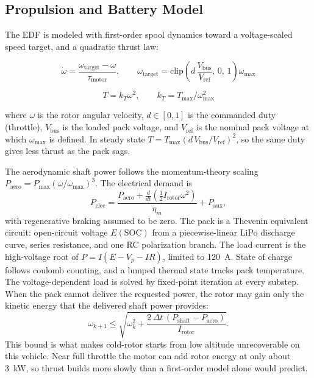 \documentclass[conference]{IEEEtran}
\begin{document}
\subsection{Propulsion and Battery Model}
\label{sec:propulsion}

The EDF is modeled with first-order spool dynamics toward a voltage-scaled speed target, and a quadratic thrust law:

\begin{equation}
\dot{\omega} = \frac{\omega_{\text{target}} - \omega}{\tau_{\text{motor}}}, \qquad
\omega_{\text{target}} = \text{clip}\!\left(d\,\frac{V_{\text{bus}}}{V_{\text{ref}}},\,0,\,1\right)\omega_{\max}
\label{eq:spool}
\end{equation}

\begin{equation}
T = k_T \omega^2, \qquad k_T = T_{\max}/\omega_{\max}^2
\label{eq:thrust}
\end{equation}

\noindent where $\omega$ is the rotor angular velocity, $d \in [0,1]$ is the commanded duty (throttle), $V_{\text{bus}}$ is the loaded pack voltage, and $V_{\text{ref}}$ is the nominal pack voltage at which $\omega_{\max}$ is defined. In steady state $T = T_{\max}(d\,V_{\text{bus}}/V_{\text{ref}})^2$, so the same duty gives less thrust as the pack sags.

The aerodynamic shaft power follows the momentum-theory scaling $P_{\text{aero}} = P_{\max}(\omega/\omega_{\max})^3$. The electrical demand is
\begin{equation}
P_{\text{elec}} = \frac{P_{\text{aero}} + \frac{d}{dt}\left(\tfrac{1}{2}I_{\text{rotor}}\omega^2\right)}{\eta_m} + P_{\text{aux}},
\label{eq:power}
\end{equation}
with regenerative braking assumed to be zero. The pack is a Thevenin equivalent circuit: open-circuit voltage $E(\text{SOC})$ from a piecewise-linear LiPo discharge curve, series resistance, and one RC polarization branch. The load current is the high-voltage root of $P = I(E - V_p - IR)$, limited to \SI{120}{\ampere}. State of charge follows coulomb counting, and a lumped thermal state tracks pack temperature. The voltage-dependent load is solved by fixed-point iteration at every substep. When the pack cannot deliver the requested power, the rotor may gain only the kinetic energy that the delivered shaft power provides:
\begin{equation}
\omega_{k+1} \le \sqrt{\omega_k^2 + \frac{2\,\Delta t\,(P_{\text{shaft}} - P_{\text{aero}})}{I_{\text{rotor}}}}.
\label{eq:energy_cap}
\end{equation}
This bound is what makes cold-rotor starts from low altitude unrecoverable on this vehicle. Near full throttle the motor can add rotor energy at only about \SI{3}{\kilo\watt}, so thrust builds more slowly than a first-order model alone would predict.
\end{document}
